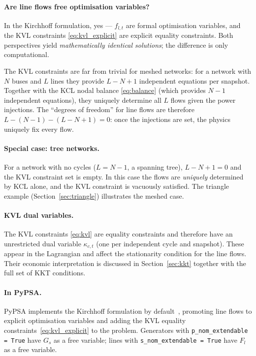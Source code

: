 \documentclass{article}
\begin{document}
\paragraph{Are line flows free optimisation variables?}
In the Kirchhoff formulation, yes --- $f_{l,t}$ are formal optimisation
variables, and the KVL constraints \eqref{eq:kvl_explicit} are explicit
equality constraints. Both perspectives yield \emph{mathematically identical
solutions}; the difference is only computational.

The KVL constraints are far from trivial for meshed networks: for a network
with $N$ buses and $L$ lines they provide $L - N + 1$ independent equations
per snapshot. Together with the KCL nodal balance \eqref{eq:balance}
(which provides $N - 1$ independent equations), they uniquely determine all
$L$ flows given the power injections. The ``degrees of freedom'' for line
flows are therefore $L - (N-1) - (L-N+1) = 0$: once the injections are set,
the physics uniquely fix every flow.

\paragraph{Special case: tree networks.}
For a network with no cycles ($L = N-1$, a spanning tree), $L - N + 1 = 0$
and the KVL constraint set is empty. In this case the flows are \emph{uniquely}
determined by KCL alone, and the KVL constraint is vacuously satisfied. The
triangle example (Section~\ref{sec:triangle}) illustrates the meshed case.

\paragraph{KVL dual variables.}
The KVL constraints \eqref{eq:kvl} are equality constraints and therefore
have an unrestricted dual variable $\kappa_{c,t}$ (one per independent cycle
and snapshot). These appear in the Lagrangian and affect the stationarity
condition for the line flows. Their economic interpretation is discussed in
Section~\ref{sec:kkt} together with the full set of KKT conditions.

\paragraph{In PyPSA.}
PyPSA implements the Kirchhoff formulation by default~\cite{Horsch2018},
promoting line flows to explicit optimisation variables and adding the KVL
equality constraints~\eqref{eq:kvl_explicit} to the problem.
Generators with \texttt{p\_nom\_extendable = True} have $G_s$ as a free variable;
lines with \texttt{s\_nom\_extendable = True} have $F_l$ as a free variable.
\end{document}
